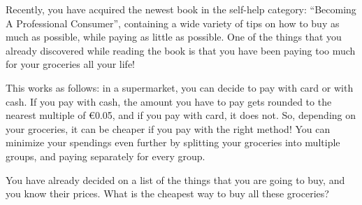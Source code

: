





Recently, you have acquired the newest book in the self-help category: ``Becoming A Professional Consumer'',
containing a wide variety of tips on how to buy as much as possible, while paying as little as possible.
One of the things that you already discovered while reading the book is that you have been paying too much for your groceries all your life!

This works as follows:
in a supermarket, you can decide to pay with card or with cash.
If you pay with cash, the amount you have to pay gets rounded to the nearest multiple of €0.05,
and if you pay with card, it does not.
So, depending on your groceries, it can be cheaper if you pay with the right method!
You can minimize your spendings even further by splitting your groceries into multiple groups, and paying separately for every group.

You have already decided on a list of the things that you are going to buy, and you know their prices.
What is the cheapest way to buy all these groceries?

